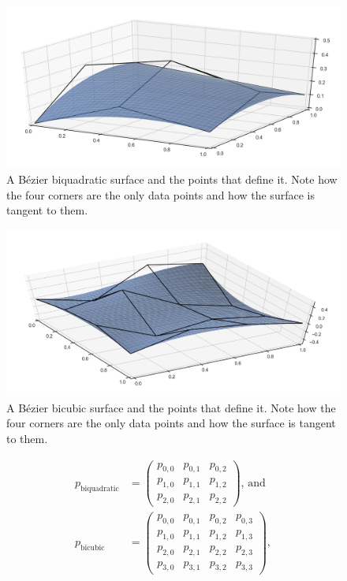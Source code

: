 \begin{figure}
\centering
\includegraphics[width=\linewidth]{figs/quadraticsurf}
\caption{A B\'ezier biquadratic surface and the points that define it.
Note how the four corners are the only data points and how the surface is tangent to them.}%
\label{fig:quadraticsurf}
\end{figure}

\begin{figure}
\centering
\includegraphics[width=\linewidth]{figs/cubicsurf}
\caption{A B\'ezier bicubic surface and the points that define it.
Note how the four corners are the only data points and how the surface is tangent to them.}%
\label{fig:cubicsurf}
\end{figure}

\begin{align}
p_{\mathrm{biquadratic}} &= \left(\begin{array}{ccc}
p_{0,0} & p_{0,1} & p_{0,2} \\
p_{1,0} & p_{1,1} & p_{1,2} \\
p_{2,0} & p_{2,1} & p_{2,2} 
\end{array}\right)\text{, and } \\
p_{\mathrm{bicubic}} &= \left(\begin{array}{cccc}
p_{0,0} & p_{0,1} & p_{0,2} & p_{0,3} \\
p_{1,0} & p_{1,1} & p_{1,2} & p_{1,3} \\
p_{2,0} & p_{2,1} & p_{2,2} & p_{2,3} \\
p_{3,0} & p_{3,1} & p_{3,2} & p_{3,3}
\end{array}\right),
\end{align}

